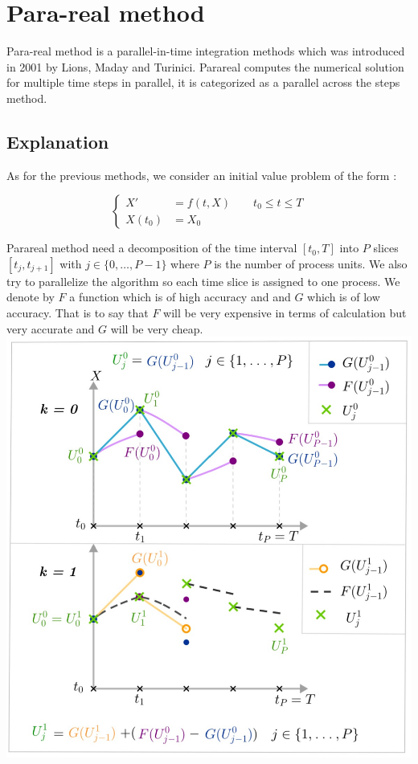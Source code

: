 \section{Para-real method}
	
Para-real method is a parallel-in-time integration methods which was introduced in 2001 by Lions, Maday and Turinici. Parareal computes the numerical solution for multiple time steps in parallel, it is categorized as a parallel across the steps method.

\subsection{Explanation}

As for the previous methods, we consider an initial value problem of the form :

$$\left\{\begin{aligned}
    X'&=f(t,X) \qquad t_0\le t\le T \\
    X(t_0)&=X_0
\end{aligned}\right.$$

\noindent Parareal method need a decomposition of the time interval $[t_0,T]$ into $P$ slices $[t_j,t_{j+1}]$ with  $j\in\{0,\dots,P-1\}$ where $P$ is the number of process units. We also try to parallelize the algorithm so each time slice is assigned to one process. We denote by $F$ a function which is of high accuracy and and $G$ which is of low accuracy. That is to say that $F$ will be very expensive in terms of calculation but very accurate and $G$ will be very cheap.  \\

\includegraphics[width=\textwidth]{"images/schema_parareal.jpg"}

